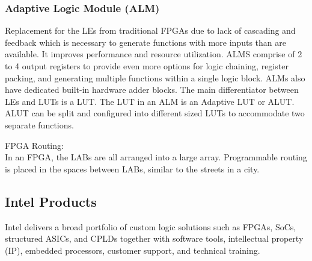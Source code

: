 \subsubsection{Adaptive Logic Module (ALM)}
Replacement for the LEs from traditional FPGAs due to lack of cascading and feedback which is necessary to generate functions with more inputs than are available. It improves performance and resource utilization. ALMS comprise of 2 to 4 output registers to provide even more options for logic chaining, register packing, and generating multiple functions within a single logic block. ALMs also have dedicated built-in hardware adder blocks. The main differentiator between LEs and LUTs is a LUT. The LUT in an ALM is an Adaptive LUT or ALUT. ALUT can be split and configured into different sized LUTs to accommodate two separate functions.

FPGA Routing:\\
In an FPGA, the LABs are all arranged into a large array. Programmable routing is placed in the spaces between LABs, similar to the streets in a city. 

\subsection{Intel Products}
Intel delivers a broad portfolio of custom logic solutions such as FPGAs, SoCs, structured ASICs, and CPLDs together with software tools, intellectual property (IP), embedded processors, customer support, and technical training.
